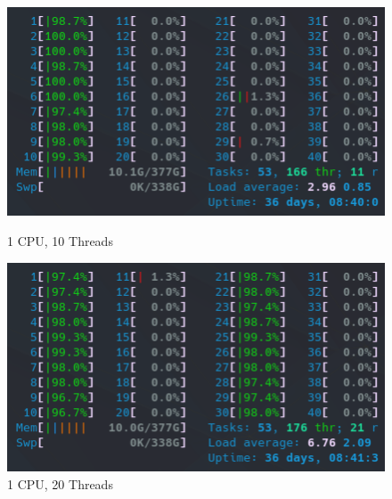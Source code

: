 \begin{figure}[!h]
    \centering
    \captionsetup{width=.48\linewidth}
    \begin{minipage}[t]{0.48\textwidth}
        \includegraphics[width=\textwidth]{figures/configurations/OMP/htop_cpus/1CPU_10Threads.png}
        \caption{1 CPU, 10 Threads}\label{fig:1CPU_10Threads}
    \end{minipage}
    \hspace{0.4cm}
    \centering
    \captionsetup{width=.48\linewidth}
    \begin{minipage}[t]{0.48\textwidth}
        \includegraphics[width=\textwidth]{figures/configurations/OMP/htop_cpus/1CPU_20Threads.png}
        \caption{1 CPU, 20 Threads}\label{fig:1CPU_20Threads}
    \end{minipage}


\end{figure}
